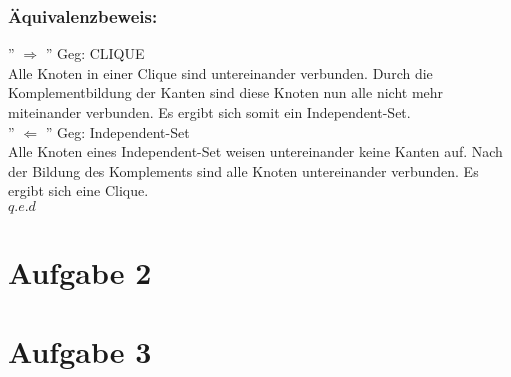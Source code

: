 \documentclass[a4paper,11pt,twoside]{article}
\begin{document}
 \subsubsection*{Äquivalenzbeweis:} 
'' $\Rightarrow$ ''
Geg: CLIQUE\\
Alle Knoten in einer Clique sind untereinander verbunden. Durch die Komplementbildung der Kanten sind diese Knoten nun alle nicht mehr miteinander verbunden. Es ergibt sich somit ein Independent-Set. \\

'' $\Leftarrow$ ''
Geg: Independent-Set\\
Alle Knoten eines Independent-Set weisen untereinander keine Kanten auf. Nach der Bildung des Komplements sind alle Knoten untereinander verbunden. Es ergibt sich eine Clique. \\

$q.e.d$


\section*{Aufgabe 2}



\section*{Aufgabe 3}
\end{document}
